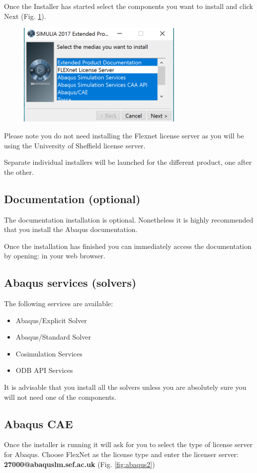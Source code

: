 \documentclass[10pt,a4paper,oneside]{article}
\begin{document}
Once the Installer has started select the components you want to install and click Next (Fig. \ref{fig:abaqus1}).
\begin{figure}[h]
\centering
\includegraphics[width=8cm]{installer1.png} 
\caption{}
\label{fig:abaqus1}
\end{figure}
Please note you do not need installing the Flexnet license server as you will be using the University of Sheffield license server.

Separate individual installers will be launched for the different product, one after the other.

\subsection{Documentation (optional)}
The documentation installation is optional. Nonetheless it is highly recommended that you install the Abaqus documentation.

Once the installation has finished you can immediately access the documentation by opening:
  in your web browser.

\subsection{Abaqus services (solvers)}
The following services are available:
\begin{itemize}
\item  Abaqus/Explicit Solver
\item Abaqus/Standard Solver
\item Cosimulation Services
\item ODB API Services
\end{itemize}
It is advisable that you install all the solvers unless you are absolutely sure you will not need one of the components. 


\subsection{Abaqus CAE}
Once the installer is running it will ask for you to select the type of license server for Abaqus. Choose FlexNet as the license type and enter the licenser server: \textbf{27000@abaquslm.sef.ac.uk} (Fig. \ref{fig:abaqus2})
\end{document}
